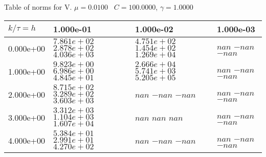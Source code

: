 \begin{center}
Table of norms for V. $\mu = 0.0100$ \, $C = 100.0000$, $\gamma = 1.0000$
  
\begin{tabular}{|p{1in}|p{1in}|p{1in}|p{1in}|} \hline
$k / \tau = h$ &1.000e-01 &1.000e-02 &1.000e-03 \\ \hline 
0.000e+00 & $7.861e+02$  $2.878e+02$  $4.036e+03$  & $4.751e+02$  $1.454e+02$  $1.269e+04$  & $nan$  $-nan$  $-nan$  \\ \hline 
1.000e+00 & $9.823e+00$  $6.986e+00$  $4.845e+01$  & $2.666e+04$  $5.741e+03$  $5.205e+05$  & $nan$  $-nan$  $-nan$  \\ \hline 
2.000e+00 & $8.715e+02$  $3.289e+02$  $3.603e+03$  & $nan$  $-nan$  $-nan$  & $nan$  $-nan$  $-nan$  \\ \hline 
3.000e+00 & $3.312e+03$  $1.104e+03$  $1.607e+04$  & $nan$  $nan$  $nan$  & $nan$  $-nan$  $-nan$  \\ \hline 
4.000e+00 & $5.384e+01$  $2.991e+01$  $4.270e+02$  & $nan$  $-nan$  $-nan$  & $nan$  $-nan$  $-nan$  \\ \hline 

\end{tabular}\\[20pt]
\end{center}
